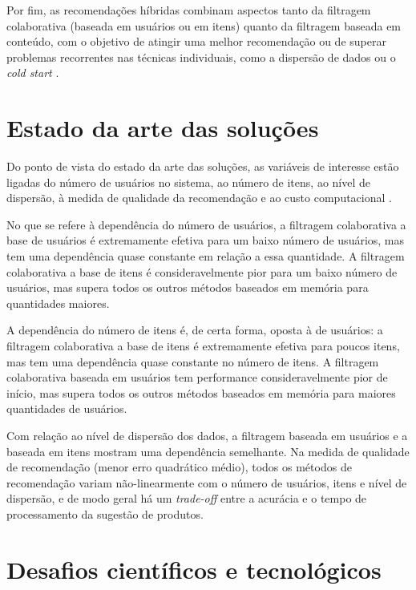 Por fim, as recomendações híbridas combinam aspectos tanto da filtragem colaborativa (baseada em usuários ou em itens) quanto da filtragem baseada em conteúdo, com o objetivo de atingir uma melhor recomendação ou de superar problemas recorrentes nas técnicas individuais, como a dispersão de dados ou o \textit{cold start} \cite{burke2007hybrid}. 

\section{Estado da arte das soluções} %
\label{sec:estado_da_arte_das_solu_es}

Do ponto de vista do estado da arte das soluções, as variáveis de interesse estão ligadas do número de usuários no sistema, ao número de itens, ao nível de dispersão, à medida de qualidade da recomendação e ao custo computacional \cite{lee2012comparative}. 

No que se refere à dependência do número de usuários, a filtragem colaborativa a base de usuários é extremamente efetiva para um baixo número de usuários, mas tem uma dependência quase constante em relação a essa quantidade. A filtragem colaborativa a base de itens é consideravelmente pior para um baixo número de usuários, mas supera todos os outros métodos baseados em memória para quantidades maiores.

A dependência do número de itens é, de certa forma, oposta à de usuários: a filtragem colaborativa a base de itens é extremamente efetiva para poucos itens, mas tem uma  
dependência quase constante no número de itens. A filtragem colaborativa baseada em usuários tem performance consideravelmente pior de início, mas supera todos os outros métodos baseados em memória para maiores quantidades de usuários.

Com relação ao nível de dispersão dos dados, a filtragem baseada em usuários e a baseada em itens mostram uma dependência semelhante. Na medida de qualidade de recomendação (menor erro quadrático médio), todos os métodos de recomendação variam não-linearmente com o número de usuários, itens e nível de dispersão, e de modo geral há um \textit{trade-off} entre a acurácia e o tempo de processamento da sugestão de produtos. 

\section{Desafios científicos e tecnológicos} %
\label{sec:desafios_cient_ficos_e_tecnol_gicos}

